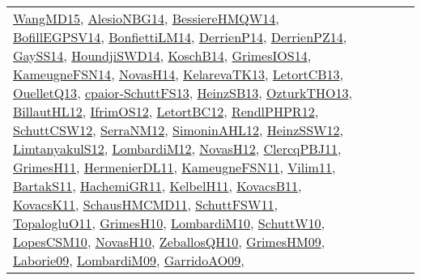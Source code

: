 {\begin{longtable}{llp{6cm}p{6cm}p{6cm}}
\href{articles/WangMD15.pdf}{WangMD15}\cite{WangMD15}, \href{papers/AlesioNBG14.pdf}{AlesioNBG14}\cite{AlesioNBG14}, \href{papers/BessiereHMQW14.pdf}{BessiereHMQW14}\cite{BessiereHMQW14}, \href{papers/BofillEGPSV14.pdf}{BofillEGPSV14}\cite{BofillEGPSV14}, \href{papers/BonfiettiLM14.pdf}{BonfiettiLM14}\cite{BonfiettiLM14}, \href{papers/DerrienP14.pdf}{DerrienP14}\cite{DerrienP14}, \href{papers/DerrienPZ14.pdf}{DerrienPZ14}\cite{DerrienPZ14}, \href{papers/GaySS14.pdf}{GaySS14}\cite{GaySS14}, \href{papers/HoundjiSWD14.pdf}{HoundjiSWD14}\cite{HoundjiSWD14}, \href{papers/KoschB14.pdf}{KoschB14}\cite{KoschB14}, \href{articles/GrimesIOS14.pdf}{GrimesIOS14}\cite{GrimesIOS14}, \href{articles/KameugneFSN14.pdf}{KameugneFSN14}\cite{KameugneFSN14}, \href{articles/NovasH14.pdf}{NovasH14}\cite{NovasH14}, \href{papers/KelarevaTK13.pdf}{KelarevaTK13}\cite{KelarevaTK13}, \href{papers/LetortCB13.pdf}{LetortCB13}\cite{LetortCB13}, \href{papers/OuelletQ13.pdf}{OuelletQ13}\cite{OuelletQ13}, \href{papers/cpaior-SchuttFS13.pdf}{cpaior-SchuttFS13}\cite{cpaior-SchuttFS13}, \href{articles/HeinzSB13.pdf}{HeinzSB13}\cite{HeinzSB13}, \href{articles/OzturkTHO13.pdf}{OzturkTHO13}\cite{OzturkTHO13}, \href{papers/BillautHL12.pdf}{BillautHL12}\cite{BillautHL12}, \href{papers/IfrimOS12.pdf}{IfrimOS12}\cite{IfrimOS12}, \href{papers/LetortBC12.pdf}{LetortBC12}\cite{LetortBC12}, \href{papers/RendlPHPR12.pdf}{RendlPHPR12}\cite{RendlPHPR12}, \href{papers/SchuttCSW12.pdf}{SchuttCSW12}\cite{SchuttCSW12}, \href{papers/SerraNM12.pdf}{SerraNM12}\cite{SerraNM12}, \href{papers/SimoninAHL12.pdf}{SimoninAHL12}\cite{SimoninAHL12}, \href{articles/HeinzSSW12.pdf}{HeinzSSW12}\cite{HeinzSSW12}, \href{articles/LimtanyakulS12.pdf}{LimtanyakulS12}\cite{LimtanyakulS12}, \href{articles/LombardiM12.pdf}{LombardiM12}\cite{LombardiM12}, \href{articles/NovasH12.pdf}{NovasH12}\cite{NovasH12}, \href{papers/ClercqPBJ11.pdf}{ClercqPBJ11}\cite{ClercqPBJ11}, \href{papers/GrimesH11.pdf}{GrimesH11}\cite{GrimesH11}, \href{papers/HermenierDL11.pdf}{HermenierDL11}\cite{HermenierDL11}, \href{papers/KameugneFSN11.pdf}{KameugneFSN11}\cite{KameugneFSN11}, \href{papers/Vilim11.pdf}{Vilim11}\cite{Vilim11}, \href{articles/BartakS11.pdf}{BartakS11}\cite{BartakS11}, \href{articles/HachemiGR11.pdf}{HachemiGR11}\cite{HachemiGR11}, \href{articles/KelbelH11.pdf}{KelbelH11}\cite{KelbelH11}, \href{articles/KovacsB11.pdf}{KovacsB11}\cite{KovacsB11}, \href{articles/KovacsK11.pdf}{KovacsK11}\cite{KovacsK11}, \href{articles/SchausHMCMD11.pdf}{SchausHMCMD11}\cite{SchausHMCMD11}, \href{articles/SchuttFSW11.pdf}{SchuttFSW11}\cite{SchuttFSW11}, \href{articles/TopalogluO11.pdf}{TopalogluO11}\cite{TopalogluO11}, \href{papers/GrimesH10.pdf}{GrimesH10}\cite{GrimesH10}, \href{papers/LombardiM10.pdf}{LombardiM10}\cite{LombardiM10}, \href{papers/SchuttW10.pdf}{SchuttW10}\cite{SchuttW10}, \href{articles/LopesCSM10.pdf}{LopesCSM10}\cite{LopesCSM10}, \href{articles/NovasH10.pdf}{NovasH10}\cite{NovasH10}, \href{articles/ZeballosQH10.pdf}{ZeballosQH10}\cite{ZeballosQH10}, \href{papers/GrimesHM09.pdf}{GrimesHM09}\cite{GrimesHM09}, \href{papers/Laborie09.pdf}{Laborie09}\cite{Laborie09}, \href{papers/LombardiM09.pdf}{LombardiM09}\cite{LombardiM09}, \href{articles/GarridoAO09.pdf}{GarridoAO09}\cite{GarridoAO09}, 
\end{longtable}}
